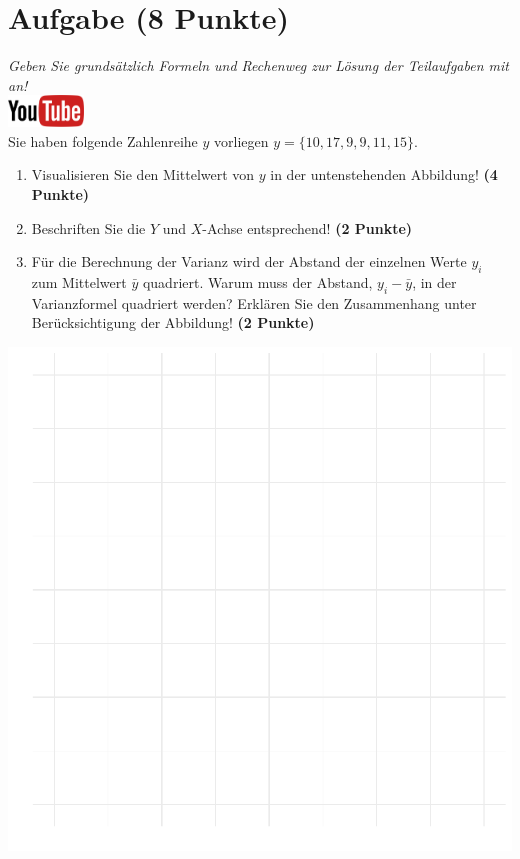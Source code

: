 \documentclass[a4paper, 9pt]{scrartcl}\usepackage[]{graphicx}\usepackage[]{xcolor}
\makeatletter
\def\maxwidth{ %
  \ifdim\Gin@nat@width>\linewidth
    \linewidth
  \else
    \Gin@nat@width
  \fi
}
\makeatother
\begin{document}
 
\clearpage

\section{Aufgabe \hfill (8 Punkte)}

\textit{Geben Sie grunds{\"a}tzlich Formeln und Rechenweg zur L{\"o}sung der
  Teilaufgaben mit an!} \\[1Ex]

\hfill\href{https://youtu.be/oMdtYbDInYE}{\includegraphics[width =
  2cm]{img/youtube}}\\[1Ex]

Sie haben folgende Zahlenreihe $y$ vorliegen
$y = \{10, 17, 9, 9, 11, 15\}$.

\begin{enumerate}
\item Visualisieren Sie den Mittelwert von $y$ in der untenstehenden
  Abbildung! \textbf{(4 Punkte)}
\item Beschriften Sie die $Y$ und $X$-Achse entsprechend! \textbf{(2 Punkte)}
\item F{\"u}r die Berechnung der Varianz wird der Abstand der einzelnen Werte $y_i$
  zum Mittelwert $\bar{y}$ quadriert. Warum muss der Abstand, $y_i -
  \bar{y}$, in der Varianzformel quadriert werden?
  Erkl{\"a}ren Sie den Zusammenhang unter Ber{\"u}cksichtigung der Abbildung!
  \textbf{(2 Punkte)}  
\end{enumerate}



{\centering \includegraphics[width=\maxwidth]{img/desc-01-1} 

}
\end{document}

